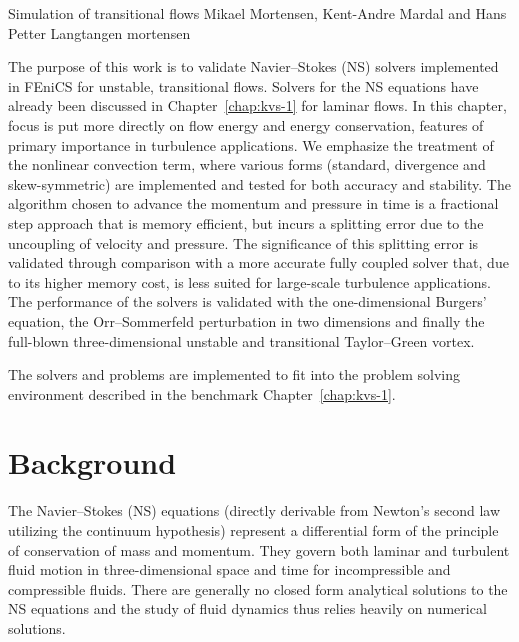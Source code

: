\renewcommand{\vec}[1]{\ensuremath{{#1}}}
\newcommand{\Nset}{\ensuremath{\mathbb{N}}\xspace}
\newcommand{\Zset}{\ensuremath{\mathbb{Z}}\xspace}
\newcommand{\Qset}{\ensuremath{\mathbb{Q}}\xspace}
\newcommand{\Cset}{\ensuremath{\mathbb{C}}\xspace}
\newcommand{\Hdivnull}{\ensuremath{Z}}

              {Simulation of transitional flows}
              {Mikael Mortensen, Kent-Andre Mardal and Hans Petter Langtangen}
              {mortensen}


The purpose of this work is to validate Navier--Stokes (NS) solvers
implemented in FEniCS for unstable, transitional flows. Solvers for the
NS equations have already been discussed in Chapter~\ref{chap:kvs-1} for
laminar flows. In this chapter, focus is put more directly on flow energy
and energy conservation, features of primary importance in turbulence
applications. We emphasize the treatment of the nonlinear convection
term, where various forms (standard, divergence and skew-symmetric) are
implemented and tested for both accuracy and stability. The algorithm
chosen to advance the momentum and pressure in time is a fractional step
approach that is memory efficient, but incurs a splitting error due to the
uncoupling of velocity and pressure. The significance of this splitting
error is validated through comparison with a more accurate fully coupled
solver that, due to its higher memory cost, is less suited for large-scale
turbulence applications. The performance of the solvers is validated with
the one-dimensional Burgers' equation, the Orr--Sommerfeld perturbation
in two dimensions and finally the full-blown three-dimensional unstable
and transitional Taylor--Green vortex.

The solvers and problems are implemented to fit into the problem solving
environment described in the benchmark Chapter~\ref{chap:kvs-1}.

\section{Background}

The Navier--Stokes (NS) equations (directly derivable from Newton's
second law utilizing the continuum hypothesis) represent a differential
form of the principle of conservation of mass and momentum. They govern
both laminar and turbulent fluid motion in three-dimensional space and
time for incompressible and compressible fluids. There are generally no
closed form analytical solutions to the NS equations and the study of
fluid dynamics thus relies heavily on numerical solutions.

